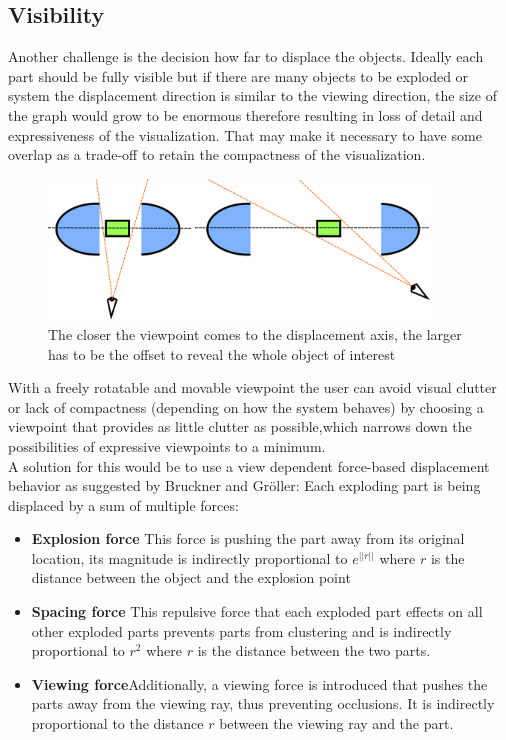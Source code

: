 \subsection{Visibility}
Another challenge is the decision how far to displace the objects. Ideally each part should be fully visible but if there are many objects to be exploded or system the displacement direction is similar to the viewing direction, the size of the graph would grow to be enormous therefore resulting in loss of detail and expressiveness of the visualization. That may make it necessary to have some overlap as a trade-off to retain the compactness of the visualization.\\
\begin{figure}[tb]
	\centering
	\includegraphics[width=0.9\textwidth]{chapters/figures/perspective}
	\caption{The closer the viewpoint comes to the displacement axis, the larger has to be the offset to reveal the whole object of interest}
	\label{fig:perspective}
\end{figure}
With a freely rotatable and movable viewpoint the user can avoid visual clutter or lack of compactness (depending on how the system behaves) by choosing a viewpoint that provides as little clutter as possible,which narrows down the possibilities of expressive viewpoints to a minimum.\\
A solution for this would be to use a view dependent force-based displacement behavior as suggested by Bruckner and Gr\"oller\cite{proc:bruckner-2006-EVV}: Each exploding part is being displaced by a sum of multiple forces:
\begin{itemize}
\item \textbf{Explosion force} This force is pushing the part away from its original location, its magnitude is indirectly proportional to $e^{||r||}$ where $r$ is the distance between the object and the explosion point
\item \textbf{Spacing force} This repulsive force that each exploded part effects on all other exploded parts prevents parts from clustering and is indirectly proportional to $r^2$ where $r$ is the distance between the two parts.
\item \textbf{Viewing force}Additionally,  a viewing force is introduced that pushes the parts away from the viewing ray, thus preventing occlusions. It is indirectly proportional to the distance $r$ between the viewing ray and the part.
\end{itemize}
